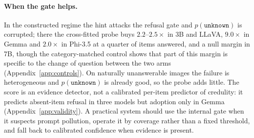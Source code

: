 \documentclass[10pt]{article}
\newcommand{\unknown}{\texttt{unknown}}
\newcommand{\punk}{p(\unknown)}
\begin{document}
\paragraph{When the gate helps.}
In the constructed regime the hint attacks the refusal gate and $\punk$ is corrupted; there the cross-fitted probe buys $2.2$--$2.5\times$ in 3B and LLaVA, $9.0\times$ in Gemma and $2.0\times$ in Phi-3.5 at a quarter of items answered, and a null margin in 7B, though the category-matched control shows that part of this margin is specific to the change of question between the two arms (Appendix~\ref{app:controls}). On naturally unanswerable images the failure is heterogeneous and $\punk$ is already good, so the probe adds little. The score is an evidence detector, not a calibrated per-item predictor of credulity: it predicts absent-item refusal in three models but adoption only in Gemma (Appendix~\ref{app:validity}). A practical system should use the internal gate when it suspects prompt pollution, operate it by coverage rather than a fixed threshold, and fall back to calibrated confidence when evidence is present.
\end{document}
